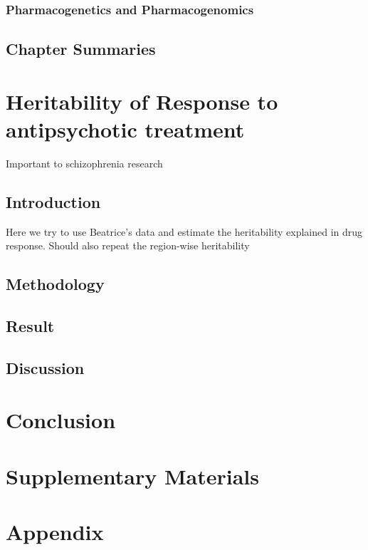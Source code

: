 \documentclass[12pt]{book}
\newcommand{\beginsupplement}{%
	\setcounter{table}{0}
	\renewcommand{\thetable}{S\arabic{table}}%
	\setcounter{figure}{0}
	\renewcommand{\thefigure}{S\arabic{figure}}%
}
\begin{document}
	\subsection{Pharmacogenetics and Pharmacogenomics}
	\section{Chapter Summaries}
	
	
	

	\chapter{Heritability of Response to antipsychotic treatment}
	Important to schizophrenia research
	
	\section{Introduction}
	Here we try to use Beatrice's data and estimate the heritability explained in drug response.
	Should also repeat the region-wise heritability
	\section{Methodology}
	\section{Result}
	\section{Discussion}

	\chapter{Conclusion}
	
	
	
	
	
	
	
	
	\backmatter
	\printbibliography[heading=bibintoc,title={Bibliography}]
	\chapter*{Supplementary Materials}
	\beginsupplement
	\chapter*{Appendix}
\end{document}
